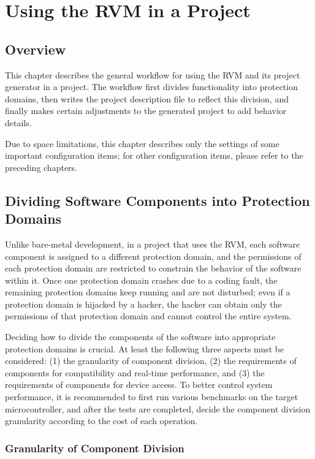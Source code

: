 \chapter{Using the RVM in a Project}\label{ch:6-using-rvm}

\section{Overview}\label{sec:6-1}

This chapter describes the general workflow for using the RVM and its project generator in a project. The workflow first divides functionality into protection domains, then writes the project description file to reflect this division, and finally makes certain adjustments to the generated project to add behavior details.

Due to space limitations, this chapter describes only the settings of some important configuration items; for other configuration items, please refer to the preceding chapters.

\section{Dividing Software Components into Protection Domains}\label{sec:6-2}

Unlike bare-metal development, in a project that uses the RVM, each software component is assigned to a different protection domain, and the permissions of each protection domain are restricted to constrain the behavior of the software within it. Once one protection domain crashes due to a coding fault, the remaining protection domains keep running and are not disturbed; even if a protection domain is hijacked by a hacker, the hacker can obtain only the permissions of that protection domain and cannot control the entire system.

Deciding how to divide the components of the software into appropriate protection domains is crucial. At least the following three aspects must be considered: (1) the granularity of component division, (2) the requirements of components for compatibility and real-time performance, and (3) the requirements of components for device access. To better control system performance, it is recommended to first run various benchmarks on the target microcontroller, and after the tests are completed, decide the component division granularity according to the cost of each operation.

\subsection{Granularity of Component Division}\label{subsec:6-2-1}

